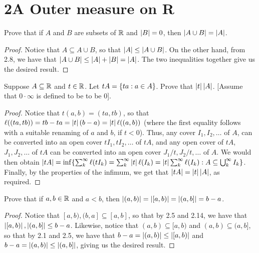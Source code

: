 \section{2A Outer measure on R}


\begin{exercise}{1}
Prove that if $A$ and $B$ are subsets of $\mathbb{R}$ and $\left\lvert B\right\rvert=0$, then $\left\lvert A\cup B\right\rvert = \left\lvert A\right\rvert$.
\end{exercise}
\begin{proof}
Notice that $A\subseteq A\cup B$, so that $\left\lvert A\right\rvert\leq \left\lvert A\cup B\right\rvert$. 
On the other hand, from 2.8, we have that $\left\lvert A\cup B\right\rvert\leq \left\lvert A\right\rvert + \left\lvert B\right\rvert = \left\lvert A\right\rvert$.
The two inequalities together give us the desired result.
\end{proof} 

\begin{exercise}{2}
Suppose $A\subseteq\mathbb{R}$ and $t\in\mathbb{R}$.
Let $tA=\{ta:a\in A\}$.
Prove that $\left\lvert t\right\rvert\left\lvert A\right\rvert$.
[Assume that $0\cdot\infty$ is defined to be to be 0].
\end{exercise}
\begin{proof}
Notice that $t(a,b) = (ta,tb)$, so that $\ell((ta,tb))= tb-ta = \left\lvert t\right\rvert(b-a) = \left\lvert t\right\rvert\ell((a,b))$ (where the first equality follows with a suitable renaming of $a$ and $b$, if $t<0$).
Thus, any cover $I_1,I_2,\dots$ of $A$, can be converted into an open cover $tI_1,tI_2,\dots$ of $tA$, and any open cover of $tA$, $J_1,J_2,\dots$ of $tA$ can be converted into an open cover $J_1/t, J_2/t,\dots$ of $A$.
We would then obtain $\left\lvert tA\right\rvert = \inf\{\sum_k^\infty \ell(tI_k) = \sum_k^\infty \left\lvert t\right\rvert\ell(I_k) = \left\lvert t\right\rvert\sum_k^\infty \ell(I_k): A\subseteq \bigcup_k^\infty I_k\}$.
Finally, by the properties of the infimum, we get that $\left\lvert tA\right\rvert = \left\lvert t\right\rvert\left\lvert A\right\rvert$, as required.
\end{proof} 

\begin{exercise}{6}
Prove that if $a,b\in\mathbb{R}$ and $a<b$, then $\left\lvert (a,b)\right\rvert = \left\lvert [a,b)\right\rvert = \left\lvert (a,b]\right\rvert = b-a$.
\end{exercise}
\begin{proof}
Notice that $[a,b), (b,a] \subseteq [a,b]$, so that by 2.5 and 2.14, we have that $\left\lvert [a,b)\right\rvert, \left\lvert (a,b]\right\rvert \leq b-a$.
Likewise, notice that $(a,b)\subseteq [a,b)$ and $(a,b)\subseteq (a,b]$, so that by 2.1 and 2.5, we have that $b-a = \left\lvert (a,b)\right\rvert \leq \left\lvert [a,b)\right\rvert$ and $b-a = \left\lvert (a,b)\right\rvert \leq \left\lvert (a,b]\right\rvert$, giving us the desired result.
\end{proof} 

